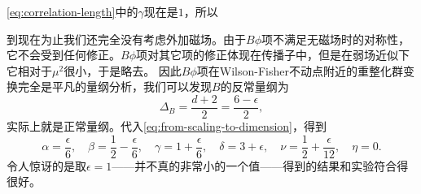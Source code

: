\documentclass[hyperref, UTF8, a4paper]{ctexart}
\begin{document}
\eqref{eq:correlation-length}中的$\gamma$现在是$1$，所以

到现在为止我们还完全没有考虑外加磁场。由于$B \phi$项不满足无磁场时的对称性，它不会受到任何修正。$B \phi$项对其它项的修正体现在传播子中，但是在弱场近似下它相对于$\mu^2$很小，于是略去。
因此$B \phi$项在Wilson-Fisher不动点附近的重整化群变换完全是平凡的量纲分析，我们可以发现$B$的反常量纲为
\begin{equation}
    \Delta_B = \frac{d+2}{2} = \frac{6-\epsilon}{2},
\end{equation}
实际上就是正常量纲。代入\eqref{eq:from-scaling-to-dimension}，得到
\begin{equation}
    \alpha = \frac{\epsilon}{6}, \quad \beta = \frac{1}{2} - \frac{\epsilon}{6}, \quad \gamma = 1 + \frac{\epsilon}{6}, \quad \delta = 3 + \epsilon, \quad \nu = \frac{1}{2} + \frac{\epsilon}{12}, \quad \eta = 0.
\end{equation}
令人惊讶的是取$\epsilon=1$——并不真的非常小的一个值——得到的结果和实验符合得很好。
\end{document}
